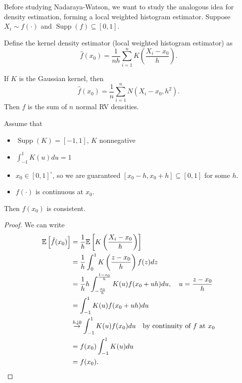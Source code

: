Before studying Nadaraya-Watson, we want to study the analogous idea for density estimation, forming a local weighted histogram estimator. Suppose $X_i \sim f(\cdot )$ and $\operatorname{Supp}(f) \subseteq  [0,1]$. 

\begin{definition}
	Define the kernel density estimator (local weighted histogram estimator) as \[
		\hat{f}(x_0) = \frac{1}{nh} \sum\limits_{i=1}^{n} K\left( \frac{X_i - x_0}{h} \right)
	.\]
\end{definition}

\begin{remark}	If $K$ is the Gaussian kernel, then \[
		\hat{f}(x_0) = \frac{1}{n} \sum\limits_{i=1}^{n} N(X_i- x_0, h^2)
	.\] Then $\hat{f}$ is the sum of $n$ normal RV densities.
\end{remark}

\begin{proposition}	Assume that
	\begin{itemize}
		\item $\operatorname{Supp}(K) = [-1,1]$, $K$ nonnegative
		\item $\int_{-1}^{1} K(u)du = 1 $ 
		\item $x_0 \in [0,1]^{\circ}$, so we are guaranteed $[x_0-h,x_0+h] \subseteq [0,1]$ for some $h$.
		\item $f(\cdot )$ is continuous at $x_0$.
	\end{itemize}

	Then $\hat{f}(x_0)$ is consistent.
\end{proposition}


\begin{proof} We can write
	\begin{align*}
	\mathbb{E}\left[\hat{f}(x_0)\right] &= \frac{1}{h} \mathbb{E}\left[K\left( \frac{X_i - x_0}{h} \right)\right] \\
	&= \frac{1}{h} \int_{0}^{1} K\left( \frac{z-x_0}{h} \right)f(z)dz \\
	&= \frac{1}{h} h \int_{-\frac{x_0}{h}}^{\frac{1-x_0}{h}} K(u) f(x_0 + uh)du,\quad u = \frac{z-x_0}{h} \\
	&= \int_{-1}^{1} K(u) f(x_0 + uh)du \\
	&\overset{h \downarrow 0}{\to} \int_{-1}^{1} K(u) f(x_0)du \quad \text{by continuity of $f$ at $x_0$} \\
	&= f(x_0) \int_{-1}^{1} K(u)du \\
	&= f(x_0) .
	\end{align*}
\end{proof}

